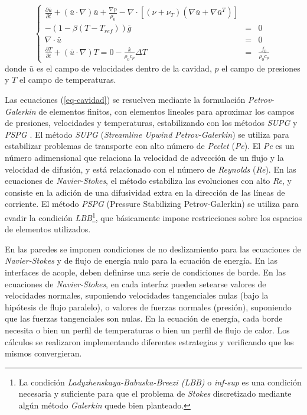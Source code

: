 \begin{equation}
\left\{ \begin{array}{rcl}
\displaystyle \frac {\partial \bar{u}}{\partial t} + ( \bar{u} \cdot \nabla) \bar{u}  + \frac {\nabla p}{\rho_0} - 
\nabla \cdot \left[ \left( \nu + \nu_T \right) \left( \nabla \bar{u} + \nabla \bar{u}^T \right) \right] && \\
- \left( 1- \beta (T-T_{ref}) \right)\bar{g} &=& 0 \\ [0.2cm]
\nabla \cdot \bar{u} &=& 0 \\ [0.2cm]
\displaystyle \frac {\partial T}{\partial t} + ( \bar{u} \cdot \nabla) T =0 - \frac {k}{\rho_0 c_p} \Delta T &=& \displaystyle \frac{f_0}{\rho_0 c_p}
\label{eq-cavidad}
\end{array}
\right.
\end{equation}
donde $\bar{u}$ es el campo de velocidades dentro de la cavidad,
$p$ el campo de presiones y
$T$ el campo de temperaturas.

Las ecuaciones (\ref{eq-cavidad}) se resuelven mediante la formulación \textit{Petrov-Galerkin} \cite{galerkin} de elementos finitos, 
con elementos lineales para aproximar los campos de presiones, velocidades y temperaturas, 
estabilizando con los métodos \textit{SUPG} \cite{supg} y \textit{PSPG} \cite{pspg}.
El método \textit{SUPG} (\textit{Streamline Upwind Petrov-Galerkin}) se utiliza para estabilizar problemas de transporte con alto número de \textit{Peclet} (\textit{Pe}).
El \textit{Pe} es un número adimensional que relaciona la velocidad de advección de un flujo y la velocidad de difusión, y está relacionado con el número de \textit{Reynolds} (\textit{Re}).
En las ecuaciones de \textit{Navier-Stokes}, el método estabiliza las evoluciones con alto \textit{Re},
y consiste en la adición de una difusividad extra en la dirección de las líneas de corriente.
El método \textit{PSPG} (Pressure Stabilizing Petrov-Galerkin) se utiliza para evadir la condición \textit{LBB}\footnote{
La condición \textit{Ladyzhenskaya-Babuska-Breezi (LBB)} o \textit{inf-sup}
es una condición necesaria y suficiente para que el problema de \textit{Stokes}
discretizado mediante algún método \textit{Galerkin}
quede bien planteado.
},
que básicamente impone restricciones sobre los espacios de elementos utilizados.

En las paredes se imponen condiciones de no deslizamiento para las ecuaciones de \textit{Navier-Stokes} y de flujo de energía nulo para la ecuación de energía.
En las interfaces de acople, deben definirse una serie de condiciones de borde.
En las ecuaciones de \textit{Navier-Stokes}, en cada interfaz pueden setearse valores de velocidades normales, suponiendo velocidades tangenciales nulas (bajo la hipótesis de flujo paralelo),
o valores de fuerzas normales (presión), suponiendo que las fuerzas tangenciales son nulas.
En la ecuación de energía, cada borde necesita o bien un perfil de temperaturas o bien un perfil de flujo de calor.
Los cálculos se realizaron implementando diferentes estrategias y verificando que los mismos convergieran.

